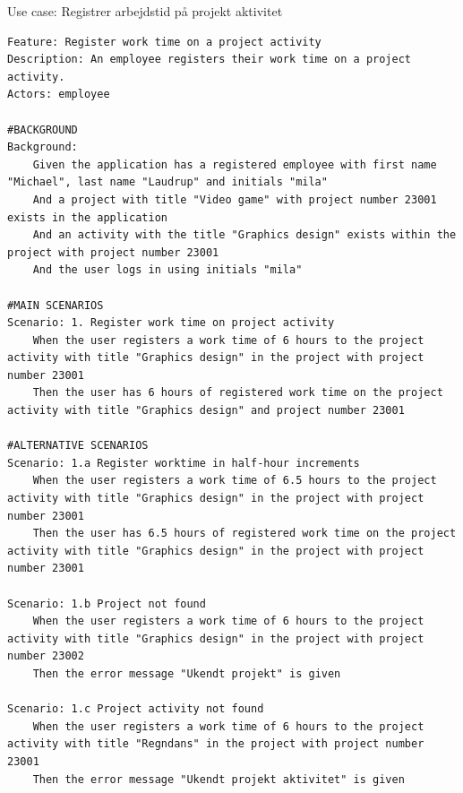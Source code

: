 \begin{listing}[H]
    \centering
    \caption{Use case: Registrer arbejdstid på projekt aktivitet} \label{lst:usecase_register_worktime_projectactivity}
    \begin{verbatim}  
Feature: Register work time on a project activity
Description: An employee registers their work time on a project activity.
Actors: employee

#BACKGROUND
Background:
    Given the application has a registered employee with first name "Michael", last name "Laudrup" and initials "mila"
    And a project with title "Video game" with project number 23001 exists in the application
    And an activity with the title "Graphics design" exists within the project with project number 23001
    And the user logs in using initials "mila"

#MAIN SCENARIOS
Scenario: 1. Register work time on project activity
    When the user registers a work time of 6 hours to the project activity with title "Graphics design" in the project with project number 23001
    Then the user has 6 hours of registered work time on the project activity with title "Graphics design" and project number 23001

#ALTERNATIVE SCENARIOS
Scenario: 1.a Register worktime in half-hour increments
    When the user registers a work time of 6.5 hours to the project activity with title "Graphics design" in the project with project number 23001
    Then the user has 6.5 hours of registered work time on the project activity with title "Graphics design" in the project with project number 23001

Scenario: 1.b Project not found
    When the user registers a work time of 6 hours to the project activity with title "Graphics design" in the project with project number 23002
    Then the error message "Ukendt projekt" is given 
    
Scenario: 1.c Project activity not found
    When the user registers a work time of 6 hours to the project activity with title "Regndans" in the project with project number 23001
    Then the error message "Ukendt projekt aktivitet" is given 
    \end{verbatim}
\end{listing}
